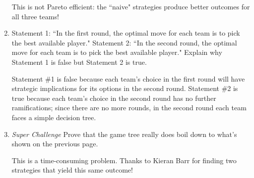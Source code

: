 \documentclass[twoside]{article}
\begin{document}
\begin{enumerate}
\begin{KEY}
This is not Pareto efficient: the ``naive" strategies produce
better outcomes for all three teams!
\end{KEY}

    \item \begin{EXAM} Statement 1: ``In the first round, the optimal move for each team is to pick the best available player."  Statement 2: ``In the second round, the optimal move for each team is to pick the best available player."  Explain why Statement 1 is false but Statement 2 is true.\end{EXAM}

\begin{KEY}
Statement \#1 is false because each team's choice in the first round will have strategic implications for its options in the second round. Statement \#2 is true because each team's choice in the second round has no further ramifications; since there are no more rounds, in the second round each team faces a simple decision tree.
\end{KEY}

    \item \begin{EXAM} \emph{Super Challenge} Prove that the game tree really does boil down to what's shown on the previous page.\end{EXAM}

\begin{KEY}
This is a time-consuming problem. Thanks to Kieran Barr for finding two strategies that yield this same outcome! 
\end{KEY}

    \end{enumerate}
\end{document}
